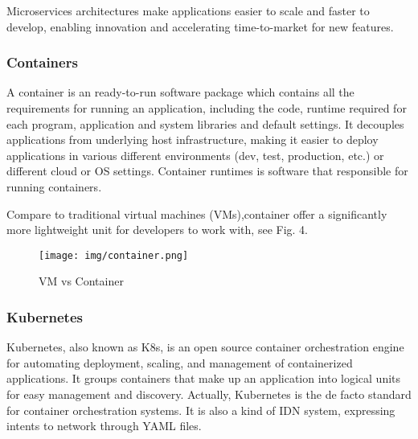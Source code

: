 \documentclass[12pt, draftclsnofoot, onecolumn]{IEEEtran}
\begin{document}
Microservices architectures make applications easier to scale and faster to develop, enabling innovation and accelerating time-to-market for new features.
\subsubsection{Containers}
A container is an ready-to-run software package which contains all the requirements for running an application, including the code, runtime required for each program, application and system libraries and default settings. It decouples applications from underlying host infrastructure, making it easier to deploy applications in various different  environments (dev, test, production, etc.) or different cloud or OS settings. Container runtimes is software that responsible for running containers.

Compare to traditional virtual machines (VMs),container offer a significantly more lightweight unit for developers to work with, see Fig. 4.

\begin{figure}
	\centering
	\texttt{[image: img/container.png]}
	\caption{VM vs Container}
\end{figure}
\subsubsection{Kubernetes}
Kubernetes\cite{k8s}, also known as K8s, is an open source container orchestration engine for automating deployment, scaling, and management of containerized applications. It groups containers that make up an application into logical units for easy management and discovery. Actually, Kubernetes is the de facto standard for container orchestration systems. It is also a kind of IDN system, expressing intents to network through YAML files.
\end{document}
